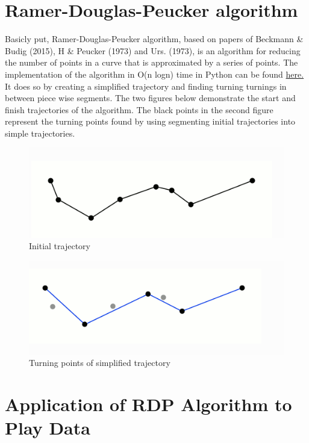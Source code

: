 \documentclass[12pt,oneside]{dukestatscithesis}
\theoremstyle{definition}
\theoremstyle{definition}
\theoremstyle{definition}
\theoremstyle{remark}
\begin{document}
\section{Ramer-Douglas-Peucker
algorithm}\label{ramer-douglas-peucker-algorithm}

Basicly put, Ramer-Douglas-Peucker algorithm, based on papers of
Beckmann \& Budig (2015), H \& Peucker (1973) and Urs. (1973), is an
algorithm for reducing the number of points in a curve that is
approximated by a series of points. The implementation of the algorithm
in O(n logn) time in Python can be found
\href{https://github.com/fhirschmann/rdp}{here.} It does so by creating
a simplified trajectory and finding turning turnings in between piece
wise segments. The two figures below demonstrate the start and finish
trajectories of the algorithm. The black points in the second figure
represent the turning points found by using segmenting initial
trajectories into simple trajectories.
\begin{figure}
\includegraphics[width=6.94in,angle=360, scale=0.5]{figure/rdp1} \caption{Initial trajectory}\label{fig:rdp}
\end{figure}
\begin{figure}
\includegraphics[width=7.11in,angle=360, scale=0.5]{figure/rdp2} \caption{Turning points of simplified trajectory}\label{fig:rdp2}
\end{figure}
\section{Application of RDP Algorithm to Play
Data}\label{application-of-rdp-algorithm-to-play-data}
\end{document}
